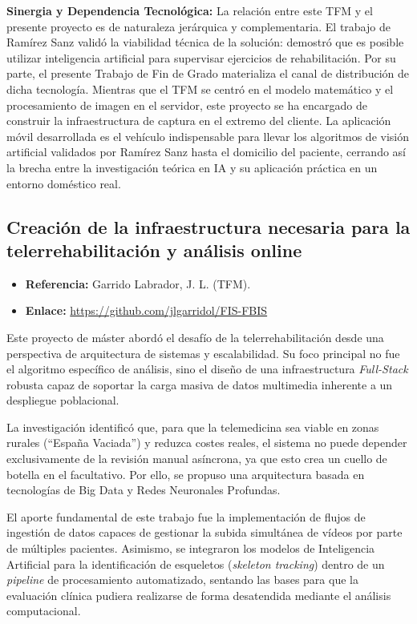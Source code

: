 \textbf{Sinergia y Dependencia Tecnológica:} La relación entre este TFM y el presente proyecto es de naturaleza jerárquica y complementaria. El trabajo de Ramírez Sanz validó la viabilidad técnica de la solución: demostró que es posible utilizar inteligencia artificial para supervisar ejercicios de rehabilitación. Por su parte, el presente Trabajo de Fin de Grado materializa el canal de distribución de dicha tecnología. Mientras que el TFM se centró en el modelo matemático y el procesamiento de imagen en el servidor, este proyecto se ha encargado de construir la infraestructura de captura en el extremo del cliente. La aplicación móvil desarrollada es el vehículo indispensable para llevar los algoritmos de visión artificial validados por Ramírez Sanz hasta el domicilio del paciente, cerrando así la brecha entre la investigación teórica en IA y su aplicación práctica en un entorno doméstico real.

\subsection{Creación de la infraestructura necesaria para la telerrehabilitación y análisis online}

\begin{itemize}
    \item \textbf{Referencia:} Garrido Labrador, J. L. (TFM).
    \item \textbf{Enlace:} \url{https://github.com/jlgarridol/FIS-FBIS}
\end{itemize}

Este proyecto de máster abordó el desafío de la telerrehabilitación desde una perspectiva de arquitectura de sistemas y escalabilidad. Su foco principal no fue el algoritmo específico de análisis, sino el diseño de una infraestructura \textit{Full-Stack} robusta capaz de soportar la carga masiva de datos multimedia inherente a un despliegue poblacional.

La investigación identificó que, para que la telemedicina sea viable en zonas rurales (``España Vaciada'') y reduzca costes reales, el sistema no puede depender exclusivamente de la revisión manual asíncrona, ya que esto crea un cuello de botella en el facultativo. Por ello, se propuso una arquitectura basada en tecnologías de Big Data y Redes Neuronales Profundas.

El aporte fundamental de este trabajo fue la implementación de flujos de ingestión de datos capaces de gestionar la subida simultánea de vídeos por parte de múltiples pacientes. Asimismo, se integraron los modelos de Inteligencia Artificial para la identificación de esqueletos (\textit{skeleton tracking}) dentro de un \textit{pipeline} de procesamiento automatizado, sentando las bases para que la evaluación clínica pudiera realizarse de forma desatendida mediante el análisis computacional.

